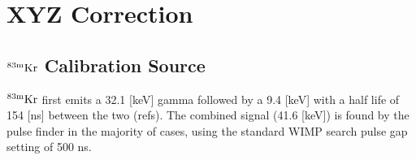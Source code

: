 
\renewcommand{\thechapter}{3}

\chapter{XYZ Correction}

\section{$\rm^{83m}Kr$ Calibration Source}

$\rm^{83m}Kr$ first emits a 32.1 [keV] gamma followed by a 9.4 [keV] with a half life of 154 [ns] between the two (refs). The combined signal (41.6 [keV]) is found by the pulse finder in the majority of cases, using the standard WIMP search pulse gap setting of 500 ns. 
